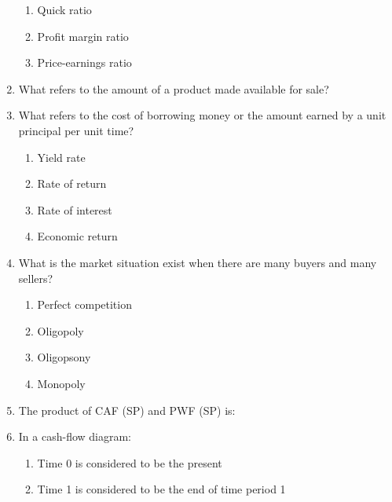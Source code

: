 \documentclass[11pt,a4paper]{article}
\begin{document}
\begin{enumerate}
\begin{enumerate}[label=\Alph*.]
\item{Quick ratio}
\item{Profit margin ratio}
\item{Price-earnings ratio}
\end{enumerate}
\item{What refers to the amount of a product made available for sale?}
\\
\item{What refers to the cost of borrowing money or the amount earned by a unit principal per unit time?}
\begin{enumerate}[label=\Alph*.]
\item{Yield rate}
\item{Rate of return}
\item{Rate of interest}
\item{Economic return}
\end{enumerate}
\item{What is the market situation exist when there are many buyers and many sellers?}
\begin{enumerate}[label=\Alph*.]
\item{Perfect competition}
\item{Oligopoly}
\item{Oligopsony}
\item{Monopoly}
\end{enumerate}
\item{The product of CAF (SP) and PWF (SP) is:}
\\
\item{In a cash-flow diagram:}
\begin{enumerate}[label=\Alph*.]
\item{Time 0 is considered to be the present}
\item{Time 1 is considered to be the end of time period 1}

\end{enumerate}
\end{enumerate}
\end{document}
